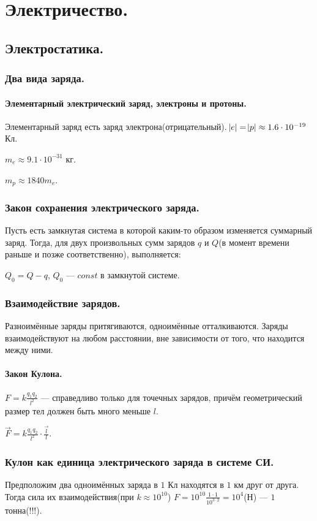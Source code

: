 \documentclass{article}
\begin{document}
\section{Электричество.}
    \subsection{Электростатика.}
        \subsubsection{Два вида заряда.}
            \paragraph{Элементарный электрический заряд, электроны и протоны.}
                Элементарный заряд есть заряд электрона(отрицательный). \(\abs{e} = \abs{p} \approx 1.6 \cdot 10^{-19} \) Кл.

                \(m_e \approx 9.1 \cdot 10^{-31}\) кг.
                
                \(m_p \approx 1840m_e\).

        \subsubsection{Закон сохранения электрического заряда.}
                Пусть есть замкнутая система в которой каким-то образом изменяется суммарный заряд. Тогда, для двух произвольных сумм зарядов \(q\) и \(Q\)(в момент времени раньше и позже соответственно), выполняется:

                \(Q_0 = Q - q\), \(Q_0\) --- \(const\) в замкнутой системе.
        \subsubsection{Взаимодействие зарядов.}
                Разноимённые заряды притягиваются, одноимённые отталкиваются. Заряды взаимодействуют на любом расстоянии, вне зависимости от того, что находится между ними.
            \paragraph{Закон Кулона.}
                \(F = k \frac{q_1 q_2}{l^2}\) --- справедливо только для точечных зарядов, причём геометрический размер тел должен быть много меньше \(l\).

                \(\vec{F} = k \frac{q_1 q_2}{l^2} \cdot \frac{\vec l}{l}\).
        \subsubsection{Кулон как единица электрического заряда в системе СИ.}
                Предположим два одноимённых заряда в \(1\) Кл находятся в \(1\) км друг от друга. Тогда сила их взаимодействия(при \(k \approx 10^{10}\)) \(F = 10^{10} \frac{1 \cdot 1}{10^{3 \cdot 2}} = 10^4\)(Н) --- \(1\) тонна(!!!).
\end{document}
